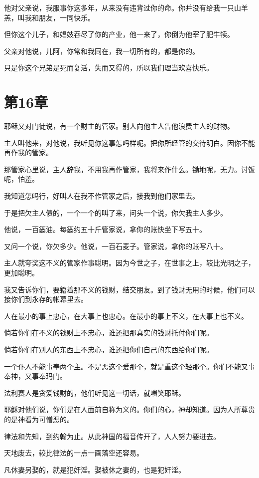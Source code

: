 \documentclass[12pt,oneside]{book}
\begin{document}
他对父亲说，我服事你这多年，从来没有违背过你的命。你并没有给我一只山羊羔，叫我和朋友，一同快乐。

但你这个儿子，和娼妓吞尽了你的产业，他一来了，你倒为他宰了肥牛犊。

父亲对他说，儿阿，你常和我同在，我一切所有的，都是你的。

只是你这个兄弟是死而复活，失而又得的，所以我们理当欢喜快乐。

\chapter{第16章}
耶稣又对门徒说，有一个财主的管家。别人向他主人告他浪费主人的财物。

主人叫他来，对他说，我听见你这事怎吗样呢。把你所经管的交待明白。因你不能再作我的管家。

那管家心里说，主人辞我，不用我再作管家，我将来作什么。锄地呢，无力。讨饭呢，怕羞。

我知道怎吗行，好叫人在我不作管家之后，接我到他们家里去。

于是把欠主人债的，一个一个的叫了来，问头一个说，你欠我主人多少。

他说，一百篓油。每篓约五十斤管家说，拿你的账快坐下写五十。

又问一个说，你欠多少。他说，一百石麦子。管家说，拿你的账写八十。

主人就夸奖这不义的管家作事聪明。因为今世之子，在世事之上，较比光明之子，更加聪明。

我又告诉你们，要籍着那不义的钱财，结交朋友。到了钱财无用的时候，他们可以接你们到永存的帐幕里去。

人在最小的事上忠心，在大事上也忠心。在最小的事上不义，在大事上也不义。

倘若你们在不义的钱财上不忠心，谁还把那真实的钱财托付你们呢。

倘若你们在别人的东西上不忠心，谁还把你们自己的东西给你们呢。

一个仆人不能事奉两个主。不是恶这个爱那个，就是重这个轻那个。你们不能又事奉神，又事奉玛门。

法利赛人是贪爱钱财的，他们听见这一切话，就嗤笑耶稣。

耶稣对他们说，你们是在人面前自称为义的。你们的心，神却知道。因为人所尊贵的是神看为可憎恶的。

律法和先知，到约翰为止。从此神国的福音传开了，人人努力要进去。

天地废去，较比律法的一点一画落空还容易。

凡休妻另娶的，就是犯奸淫。娶被休之妻的，也是犯奸淫。
\end{document}
